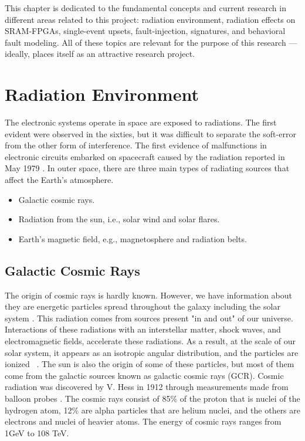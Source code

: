 This chapter is dedicated to the fundamental concepts and current research in different areas related to this project: radiation environment, radiation effects on SRAM-FPGAs, single-event upsets, fault-injection, signatures,  and behavioral fault modeling. All of these topics are relevant for the purpose of this research --- ideally, places itself as an attractive research project.


\section{Radiation Environment}
The electronic systems operate in space are exposed to radiations. The first evident were observed in the sixties, but it was difficult to separate the soft-error from the other form of interference. The first evidence of malfunctions in electronic circuits embarked on spacecraft caused by the radiation reported in May 1979 \citep{may1979alpha}. In outer space, there are three main types of radiating sources that affect the Earth's atmosphere.
\begin{itemize}
\item Galactic cosmic rays.
\item Radiation from the sun, i.e., solar wind and solar flares.
\item Earth's magnetic field, e.g., magnetosphere and radiation belts.
\end{itemize}
\subsection{Galactic Cosmic Rays} 
The origin of cosmic rays is hardly known. However, we have information about they are energetic particles spread throughout the galaxy including the solar system \citep{SWE2016}. This radiation comes from sources present "in and out" of our
universe. Interactions of these radiations with an interstellar matter, shock waves, and electromagnetic fields, accelerate these radiations. As a result, at the scale of our
solar system, it appears as an isotropic angular distribution, and the particles are ionized~ \citep{SWE2016}. The sun is also the origin of some of these particles, but most of them come from the galactic sources known as galactic cosmic rays (GCR).
Cosmic radiation was discovered by V. Hess in 1912 through measurements made from balloon probes \citep{cronin1999cosmic}. The cosmic rays consist of 85\% of the proton that is nuclei of the hydrogen atom, 12\% are alpha particles that are helium nuclei, and the others are electrons and nuclei of heavier atoms. The energy of cosmic rays ranges from 1GeV to 108 TeV. 
